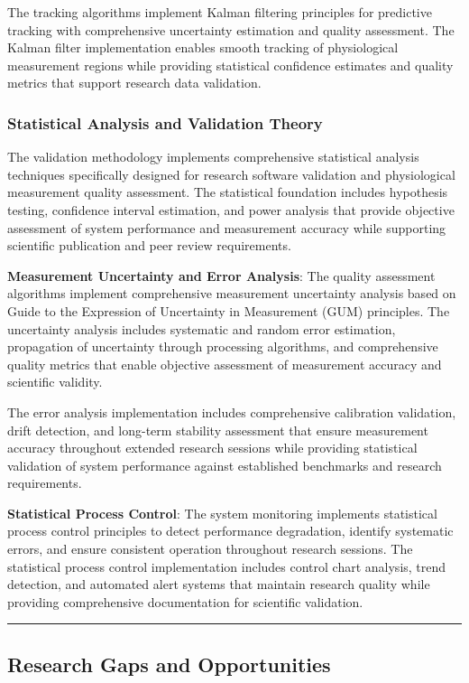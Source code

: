 \documentclass[12pt,a4paper]{article}
\begin{document}
The tracking algorithms implement Kalman filtering principles for predictive tracking with comprehensive uncertainty
estimation and quality assessment. The Kalman filter implementation enables smooth tracking of physiological measurement
regions while providing statistical confidence estimates and quality metrics that support research data validation.

\subsubsection{Statistical Analysis and Validation Theory}

The validation methodology implements comprehensive statistical analysis techniques specifically designed for research
software validation and physiological measurement quality assessment. The statistical foundation includes hypothesis
testing, confidence interval estimation, and power analysis that provide objective assessment of system performance and
measurement accuracy while supporting scientific publication and peer review requirements.

\textbf{Measurement Uncertainty and Error Analysis}: The quality assessment algorithms implement comprehensive measurement
uncertainty analysis based on Guide to the Expression of Uncertainty in Measurement (GUM) principles. The uncertainty
analysis includes systematic and random error estimation, propagation of uncertainty through processing algorithms, and
comprehensive quality metrics that enable objective assessment of measurement accuracy and scientific validity.

The error analysis implementation includes comprehensive calibration validation, drift detection, and long-term
stability assessment that ensure measurement accuracy throughout extended research sessions while providing statistical
validation of system performance against established benchmarks and research requirements.

\textbf{Statistical Process Control}: The system monitoring implements statistical process control principles to detect
performance degradation, identify systematic errors, and ensure consistent operation throughout research sessions. The
statistical process control implementation includes control chart analysis, trend detection, and automated alert systems
that maintain research quality while providing comprehensive documentation for scientific validation.

\hrule

\subsection{Research Gaps and Opportunities}
\end{document}
